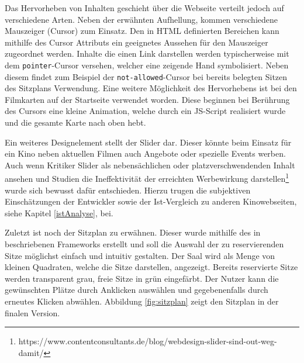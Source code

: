 	
	Das Hervorheben von Inhalten geschieht über die Webseite verteilt jedoch auf verschiedene Arten. Neben der erwähnten Aufhellung, kommen verschiedene Mauszeiger (Cursor) zum Einsatz. Den in \ac{HTML} definierten Bereichen kann mithilfe des Cursor Attributs ein geeignetes Aussehen für den Mauszeiger zugeordnet werden. Inhalte die einen Link darstellen werden typischerweise mit dem \texttt{pointer}-Cursor versehen, welcher eine zeigende Hand symbolisiert. Neben diesem findet zum Beispiel der \texttt{not-allowed}-Cursor bei bereits belegten Sitzen des Sitzplans Verwendung. Eine weitere Möglichkeit des Hervorhebens ist bei den Filmkarten auf der Startseite verwendet worden. Diese beginnen bei Berührung des Cursors eine kleine Animation, welche durch ein JS-Script realisiert wurde und die gesamte Karte nach oben hebt. 
	
	Ein weiteres Designelement stellt der Slider dar. Dieser könnte beim Einsatz für ein Kino neben aktuellen Filmen auch Angebote oder spezielle Events werben. Auch wenn Kritiker Slider als nebensächlichen oder platzverschwendenden Inhalt ansehen und Studien die Ineffektivität der erreichten Werbewirkung darstellen\footnote{https://www.contentconsultants.de/blog/webdesign-slider-sind-out-weg-damit/} wurde sich bewusst dafür entschieden. Hierzu trugen die subjektiven Einschätzungen der Entwickler sowie der Ist-Vergleich zu anderen Kinowebseiten, siehe Kapitel \vref{istAnalyse}, bei.
	
	Zuletzt ist noch der Sitzplan zu erwähnen. Dieser wurde mithilfe des in %
	beschriebenen Frameworks erstellt und soll die Auswahl der zu reservierenden Sitze möglichst einfach und intuitiv gestalten. Der Saal wird als Menge von kleinen Quadraten, welche die Sitze darstellen, angezeigt. Bereits reservierte Sitze werden transparent grau, freie Sitze in grün eingefärbt. Der Nutzer kann die gewünschten Plätze durch Anklicken auswählen und gegebenenfalls durch erneutes Klicken abwählen. Abbildung \vref{fig:sitzplan} zeigt den Sitzplan in der finalen Version.
	
